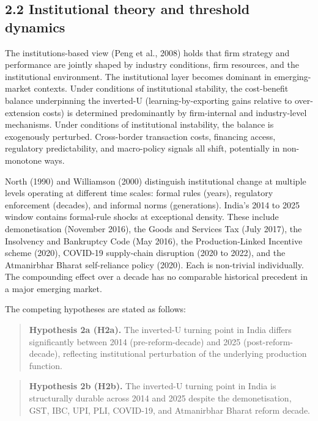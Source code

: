 \documentclass[
  12pt]{article}
\begin{document}
\hypertarget{institutional-theory-and-threshold-dynamics}{%
\subsection{2.2 Institutional theory and threshold
dynamics}\label{institutional-theory-and-threshold-dynamics}}

The institutions-based view (Peng et al., 2008) holds that firm strategy
and performance are jointly shaped by industry conditions, firm
resources, and the institutional environment. The institutional layer
becomes dominant in emerging-market contexts. Under conditions of
institutional stability, the cost-benefit balance underpinning the
inverted-U (learning-by-exporting gains relative to over-extension
costs) is determined predominantly by firm-internal and industry-level
mechanisms. Under conditions of institutional instability, the balance
is exogenously perturbed. Cross-border transaction costs, financing
access, regulatory predictability, and macro-policy signals all shift,
potentially in non-monotone ways.

North (1990) and Williamson (2000) distinguish institutional change at
multiple levels operating at different time scales: formal rules
(years), regulatory enforcement (decades), and informal norms
(generations). India's 2014 to 2025 window contains formal-rule shocks
at exceptional density. These include demonetisation (November 2016),
the Goods and Services Tax (July 2017), the Insolvency and Bankruptcy
Code (May 2016), the Production-Linked Incentive scheme (2020), COVID-19
supply-chain disruption (2020 to 2022), and the Atmanirbhar Bharat
self-reliance policy (2020). Each is non-trivial individually. The
compounding effect over a decade has no comparable historical precedent
in a major emerging market.

The competing hypotheses are stated as follows:

\begin{quote}
\textbf{Hypothesis 2a (H2a).} The inverted-U turning point in India
differs significantly between 2014 (pre-reform-decade) and 2025
(post-reform-decade), reflecting institutional perturbation of the
underlying production function.
\end{quote}

\begin{quote}
\textbf{Hypothesis 2b (H2b).} The inverted-U turning point in India is
structurally durable across 2014 and 2025 despite the demonetisation,
GST, IBC, UPI, PLI, COVID-19, and Atmanirbhar Bharat reform decade.
\end{quote}
\end{document}
